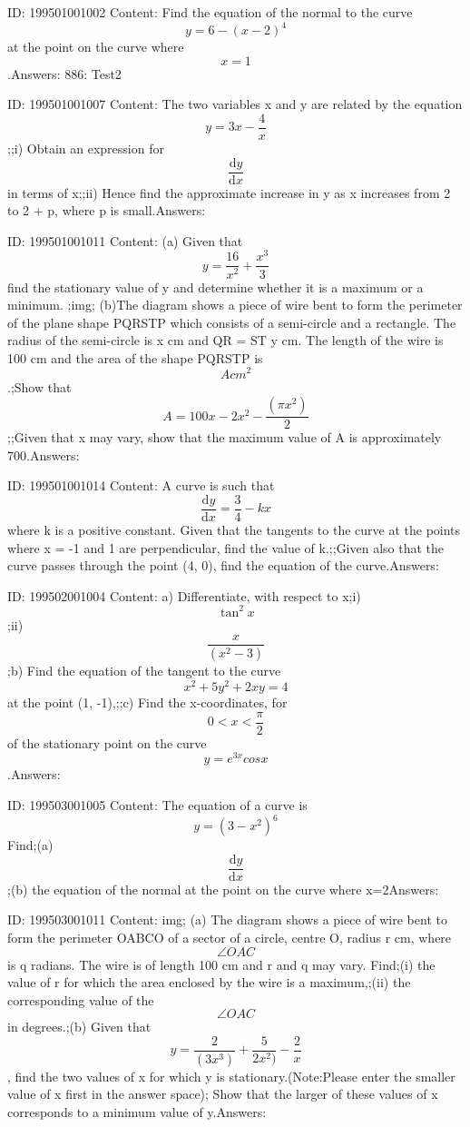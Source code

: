 \documentclass{article}
\begin{document}
ID: 199501001002
Content:
Find the equation of the normal to the curve \[y=6-(x-2)^4\] at the point on the curve where \[x=1\].Answers:
886: Test2

ID: 199501001007
Content:
The two variables x and y are related by the equation \[y = 3x - \frac{4}{x}\];;i) Obtain an expression for \[\frac{\mathrm{d} y}{\mathrm{d} x}\] in terms of x;;ii) Hence find the approximate increase in y as x increases from 2 to 2 + p, where p is small.Answers:

ID: 199501001011
Content:
(a) Given that\[y = \frac{16}{x^{2}} + \frac{x^{3}}{3}\] find the stationary value of y and determine whether it is a maximum or a minimum. ;img; (b)The diagram shows a piece of wire bent to form the perimeter of the plane shape PQRSTP which consists of a semi-circle and a rectangle. The radius of the semi-circle is x cm and QR = ST  y cm. The length of the wire is 100 cm and the area of the shape PQRSTP is \[A cm^{2}\].;Show that \[A = 100x-2x^{2}-\frac{\left ( \pi x^{2} \right )}{2}\];;Given that x may vary, show that the maximum value of A is approximately 700.Answers:

ID: 199501001014
Content:
A curve is such that \[\frac{\mathrm{d} y}{\mathrm{d} x}=\frac{3}{4}-kx\] where k is a positive constant. Given that the tangents to the curve at the points where x = -1 and 1 are perpendicular, find the value of k.;;Given also that the curve passes through the point (4, 0), find the equation of the curve.Answers:

ID: 199502001004
Content:
a) Differentiate, with respect to x;i) \[\tan ^{2}x\];ii)\[\frac{x}{\left ( x^{2}-3 \right )}\];b) Find the equation of the tangent to the curve \[x^{2}+5y^{2}+2xy = 4 \]  at the point (1, -1),;;c) Find the x-coordinates, for \[0<x<\frac{\pi }{2}\] of the stationary point on the curve \[y = e ^{3x} cosx\].Answers:

ID: 199503001005
Content:
The equation of a curve is \[y=(3-x^2)^6\] Find;(a)\[\frac{\mathrm{d} y}{\mathrm{d} x}\] ;(b) the equation of the normal at the point on the curve where x=2Answers:

ID: 199503001011
Content:
img; (a) The diagram shows a piece of wire bent to form the perimeter OABCO of a sector of a circle, centre O, radius r cm, where \[\angle OAC\]  is q radians. The wire is of length 100 cm and r and q may vary. Find;(i) the value of r for which the area enclosed by the wire is a maximum,;(ii) the corresponding value of the \[\angle OAC\]  in degrees.;(b) Given that \[y=\frac{2}{(3x^3)}+\frac{5}{2x^2)}-\frac{2}{x}\],  find the two values of x for which y is stationary.(Note:Please enter the smaller value of x first in the answer space); Show that the larger of these values of x corresponds to a minimum value of y.Answers:
\end{document}
